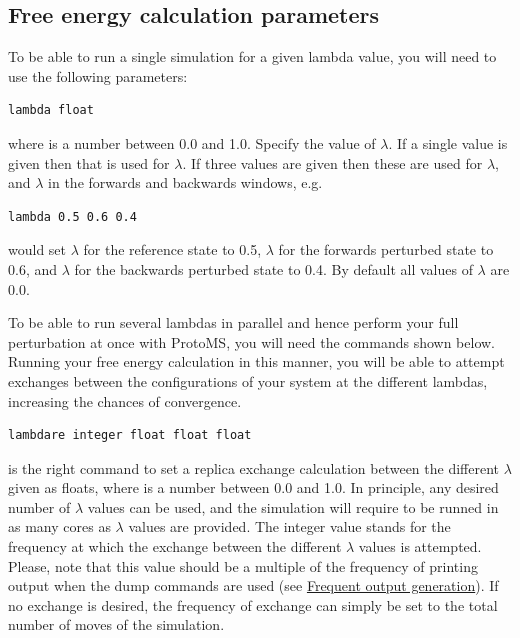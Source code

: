 \documentclass[letterpaper,10pt,english]{sphinxmanual}
\begin{document}
\subsection{Free energy calculation parameters}
\label{protoms:free-energy-calculation-parameters}
To be able to run a single simulation for a given lambda value, you will need to use the following parameters:

\begin{Verbatim}[commandchars=\\\{\}]
lambda float
\end{Verbatim}

where  is a number between 0.0 and 1.0. Specify the value of \(\lambda\). If a single value is given then that is used for \(\lambda\). If three values are given then these are used for \(\lambda\), and \(\lambda\) in the forwards and backwards windows, e.g.

\begin{Verbatim}[commandchars=\\\{\}]
lambda 0.5 0.6 0.4
\end{Verbatim}

would set \(\lambda\) for the reference state to 0.5, \(\lambda\) for the forwards perturbed state to 0.6, and \(\lambda\) for the backwards perturbed state to 0.4. By default all values of \(\lambda\) are 0.0.

To be able to run several lambdas in parallel and hence perform your full perturbation at once with ProtoMS, you will need the commands shown below. Running your free energy calculation in this manner, you will be able to attempt exchanges between the configurations of your system at the different lambdas, increasing the chances of convergence.

\begin{Verbatim}[commandchars=\\\{\}]
lambdare integer float float float
\end{Verbatim}

is the right command to set a replica exchange calculation between the different \(\lambda\) given as floats, where  is a number between 0.0 and 1.0. In principle, any desired number of \(\lambda\) values can be used, and the simulation will require to be runned in as many cores as \(\lambda\) values are provided. The integer value stands for the frequency at which the exchange between the different \(\lambda\) values is attempted. Please, note that this value should be a multiple of the frequency of printing output when the dump commands are used (see {\hyperref[protoms:frequent-output-generation]{Frequent output generation}}). If no exchange is desired, the frequency of exchange can simply be set to the total number of moves of the simulation.
\end{document}
